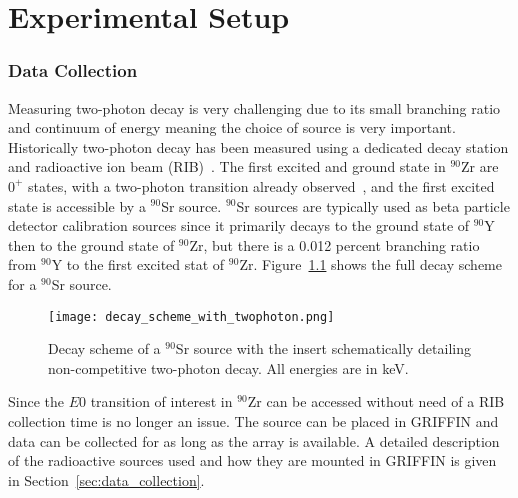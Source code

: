 \documentclass[cnatzke_thesis_proposal.tex]{subfiles}
\begin{document}
\chapter{Experimental Setup}

\subsection{Data Collection}
Measuring two-photon decay is very challenging due to its small branching ratio and continuum of energy meaning the choice of source is very important.
Historically two-photon decay has been measured using a dedicated decay station and radioactive ion beam (RIB)~\cite{kramp_nuclear_1987}.
The first excited and ground state in $^{90}$Zr are $0^+$ states, with a two-photon transition already observed~\cite{schirmer_double_1984}, and the first excited state is accessible by a $^{90}$Sr source.
$^{90}$Sr sources are typically used as beta particle detector calibration sources since it primarily decays to the ground state of $^{90}$Y then to the ground state of $^{90}$Zr, but there is a 0.012 percent branching ratio from $^{90}$Y to the first excited stat of $^{90}$Zr.
Figure~\ref{fig:decay_scheme_with_twophoton} shows the full decay scheme for a $^{90}$Sr source.

\begin{figure}[H]
  \centering
  \texttt{[image: decay\_scheme\_with\_twophoton.png]}
  \caption{Decay scheme of a $^{90}$Sr source with the insert schematically detailing non-competitive two-photon decay. All energies are in keV.}
  \label{fig:decay_scheme_with_twophoton}
\end{figure}

Since the $E0$ transition of interest in $^{90}$Zr can be accessed without need of a RIB collection time is no longer an issue.
The source can be placed in GRIFFIN and data can be collected for as long as the array is available. 
A detailed description of the radioactive sources used and how they are mounted in GRIFFIN is given in Section~\ref{sec:data_collection}.

\end{document}
